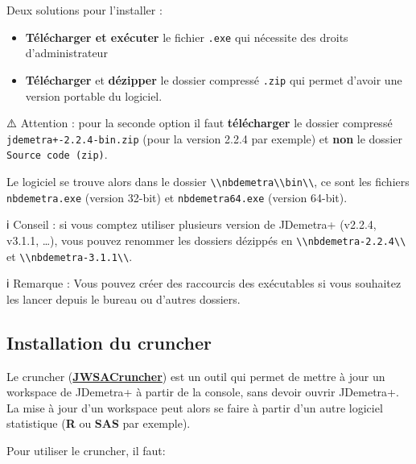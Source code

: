\documentclass[
]{article}
\providecommand{\tightlist}{%
  \setlength{\itemsep}{0pt}\setlength{\parskip}{0pt}}
\begin{document}
Deux solutions pour l'installer :

\begin{itemize}
\tightlist
\item
  \textbf{Télécharger et exécuter} le fichier \texttt{.exe} qui
  nécessite des droits d'administrateur
\item
  \textbf{Télécharger} et \textbf{dézipper} le dossier compressé
  \texttt{.zip} qui permet d'avoir une version portable du logiciel.
\end{itemize}

⚠️ Attention : pour la seconde option il faut \textbf{télécharger} le
dossier compressé \texttt{jdemetra+-2.2.4-bin.zip} (pour la version
2.2.4 par exemple) et \textbf{non} le dossier
\texttt{Source\ code\ (zip)}.

Le logiciel se trouve alors dans le dossier
\textcolor{windows_path_color}{\nolinkurl{\\nbdemetra\\bin\\}}, ce sont
les fichiers \texttt{nbdemetra.exe} (version 32-bit) et
\texttt{nbdemetra64.exe} (version 64-bit).

ℹ️ Conseil : si vous comptez utiliser plusieurs version de JDemetra+
(v2.2.4, v3.1.1, \ldots), vous pouvez renommer les dossiers dézippés en
\textcolor{windows_path_color}{\nolinkurl{\\nbdemetra-2.2.4\\}} et
\textcolor{windows_path_color}{\nolinkurl{\\nbdemetra-3.1.1\\}}.

ℹ️ Remarque : Vous pouvez créer des raccourcis des exécutables si vous
souhaitez les lancer depuis le bureau ou d'autres dossiers.

\hypertarget{installation-du-cruncher}{%
\subsection{Installation du cruncher}\label{installation-du-cruncher}}

Le cruncher
(\href{https://github.com/jdemetra/jwsacruncher}{\textbf{JWSACruncher}})
est un outil qui permet de mettre à jour un workspace de JDemetra+ à
partir de la console, sans devoir ouvrir JDemetra+. La mise à jour d'un
workspace peut alors se faire à partir d'un autre logiciel statistique
(\textbf{R} ou \textbf{SAS} par exemple).

Pour utiliser le cruncher, il faut:
\end{document}
